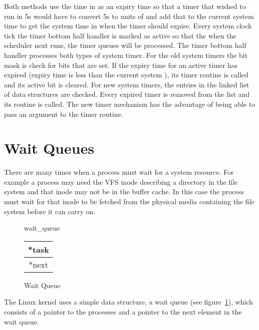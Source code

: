 Both methods use the time in  as an expiry time so that a timer that
wished to run in 5s would have to convert 5s to units of  and add that
to the current system time to get the system time in  when the timer
should expire.
Every system clock tick the timer bottom half handler is marked as active so that
the when the scheduler next runs, the timer queues will be processed.
The timer bottom half handler  processes
both types of system timer.
For the old system timers the  bit mask is check for bits that are
set.
If the expiry time for an active timer has expired (expiry time is less than
the current system ), its timer routine is called
and its active bit is cleared.
For new system timers, the entries in the linked list of  data 
structures are checked.
Every expired timer is removed from the list and its routine is called.
The new timer mechanism has the advantage of being able to pass an argument
to the timer routine.

\section{Wait Queues}
\label{wait-queues-section}
There are many times when a process must wait for a system resource.
For example a process may need the VFS inode describing a directory in the file system
and that inode may not be in the buffer cache.
In this case the process must wait for that inode to be fetched from the physical
media containing the file system before it can carry on.

\begin{figure}
{\centering 
wait\_queue \\ 
\vspace{0.30cm} 
\begin{tabular}{|c|}
\hline 
*task\\
\hline 
*next\\
\hline 
\end{tabular}
\par}
\caption{Wait Queue}
\label{wait-queue-struct}
\end{figure}
The Linux kernel uses a simple data structure, a wait queue (see figure~\ref{wait-queue-struct}),
which consists of a pointer to the processes  and a pointer to the 
next element in the wait queue.

